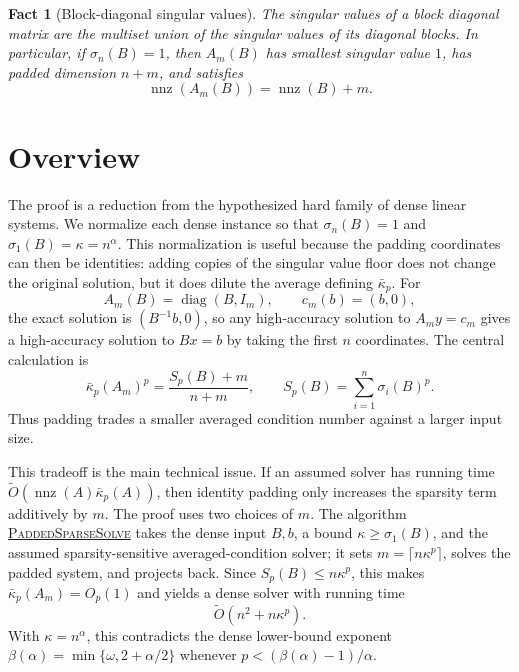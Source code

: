 \documentclass[11pt]{article}
\newtheorem{fact}[lemma]{Fact}
\begin{document}
\begin{fact}[Block-diagonal singular values]
\label{fact:block-diagonal-singular-values}
The singular values of a block diagonal matrix are the multiset union of the
singular values of its diagonal blocks.  In particular, if $\sigma_n(B)=1$,
then $A_m(B)$ has smallest singular value $1$, has padded dimension $n+m$,
and satisfies
\[
  \operatorname{nnz}(A_m(B))=\operatorname{nnz}(B)+m.
\]
\end{fact}

\section{Overview}

The proof is a reduction from the hypothesized hard family of dense linear
systems.  We normalize each dense instance so that
$\sigma_n(B)=1$ and $\sigma_1(B)=\kappa=n^\alpha$.  This normalization is
useful because the padding coordinates can then be identities: adding copies
of the singular value floor does not change the original solution, but it does
dilute the average defining $\bar{\kappa}_p$.  For
\[
  A_m(B)=\operatorname{diag}(B,I_m),\qquad c_m(b)=(b,0),
\]
the exact solution is $(B^{-1}b,0)$, so any high-accuracy solution to
$A_m y=c_m$ gives a high-accuracy solution to $Bx=b$ by taking the first
$n$ coordinates.  The central calculation is
\[
  \bar{\kappa}_p(A_m)^p
  =
  \frac{S_p(B)+m}{n+m},
  \qquad
  S_p(B)=\sum_{i=1}^n \sigma_i(B)^p.
\]
Thus padding trades a smaller averaged condition number against a larger
input size.

This tradeoff is the main technical issue.  If an assumed solver has running
time $\widetilde{O}(\operatorname{nnz}(A)\bar{\kappa}_p(A))$, then identity
padding only increases the sparsity term additively by $m$.  The proof uses
two choices of $m$.  The algorithm
\hyperref[alg:padded-sparse-solve]{\textsc{PaddedSparseSolve}} takes the dense
input $B,b$, a bound $\kappa\geq\sigma_1(B)$, and the assumed
sparsity-sensitive averaged-condition solver; it sets
$m=\lceil n\kappa^p\rceil$, solves the padded system, and projects back.  Since
$S_p(B)\leq n\kappa^p$, this makes $\bar{\kappa}_p(A_m)=O_p(1)$ and yields a
dense solver with running time
\[
  \widetilde{O}(n^2+n\kappa^p).
\]
With $\kappa=n^\alpha$, this contradicts the dense lower-bound exponent
$\beta(\alpha)=\min\{\omega,2+\alpha/2\}$ whenever
$p<(\beta(\alpha)-1)/\alpha$.
\end{document}
